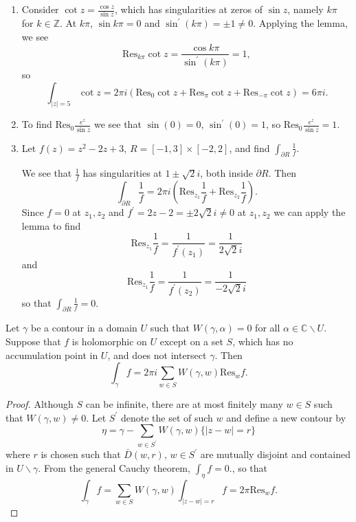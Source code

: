 \begin{xmpl}
  \begin{enumerate}
    \item{
      Consider $\cot z = \frac{\cos z}{\sin z}$, which has
      singularities at zeros of $\sin z$, namely $k \pi$ for
      $k \in \mathbb{Z}$.
      At $k\pi$, $\sin k\pi = 0$ and $\sin^\prime(k \pi) = \pm 1 \neq
      0$. Applying the lemma, we see
      $$
        \mathrm{Res}_{k \pi} \cot z
      = \frac{\cos k \pi}{\sin^\prime(k \pi)}
      = 1,
      $$
      so
      $$
        \int_{|z| = 5}
          \cot z
      = 2 \pi i
          ( \mathrm{Res}_0 \cot z
          + \mathrm{Res}_\pi \cot z
          + \mathrm{Res}_{-\pi} \cot z
          )
      = 6 \pi i.
      $$
    }
    \item{
      To find $\mathrm{Res}_0 \frac{e^z}{\sin z}$ we see that
      $\sin(0) = 0$, $\sin^\prime(0) = 1$, so
      $\mathrm{Res}_0 \frac{e^z}{\sin z} = 1$.
    }
    \item{
      Let $f(z) = z^2 - 2z + 3$,
      $R = [-1, 3] \times [-2, 2]$, and find
      $\int_{\partial R} \frac{1}{f}$.

      We see that $\frac{1}{f}$ has singularities at
      $1 \pm \sqrt{2} i$, both inside $\partial R$.
      Then
      $$
        \int_{\partial R} \frac{1}{f}
      = 2 \pi i
        (
          \mathrm{Res}_{z_1} \frac{1}{f}
        + \mathrm{Res}_{z_2} \frac{1}{f}
        ).
      $$
      Since $f = 0$ at $z_1, z_2$ and
      $f^\prime = 2z - 2 = \pm 2 \sqrt{2} i \neq 0$
      at $z_1, z_2$ we can apply the lemma to find
      $$
        \mathrm{Res}_{z_1}
          \frac{1}{f}
      = \frac{1}{f^\prime(z_1)} = \frac{1}{2 \sqrt{2} i}
      $$
      and
      $$
        \mathrm{Res}_{z_1}
          \frac{1}{f}
      = \frac{1}{f^\prime(z_2)} = \frac{1}{-2 \sqrt{2} i}
      $$
      so that $\int_{\partial R} \frac{1}{f} = 0$.
    }
  \end{enumerate}
\end{xmpl}

\begin{theorem}
Let $\gamma$ be a contour in a domain $U$ such that
$W(\gamma, \alpha) = 0$ for all
$\alpha \in \mathbb{C} \backslash U$. Suppose that $f$ is
holomorphic on $U$ except on a set $S$, which has no
accumulation point in $U$, and does not intersect $\gamma$.
Then
$$
  \int_\gamma f
= 2 \pi i
  \sum_{w \in S}
    W(\gamma, w)
    \mathrm{Res}_w f.
$$
\end{theorem}

\begin{proof}
  Although $S$ can be infinite, there are at most finitely many
  $w \in S$ such that $W(\gamma, w) \neq 0$. Let $S^\prime$
  denote the set of such $w$ and define a new contour by
  $$
    \eta
  = \gamma
  - \sum_{w \in S^\prime}
      W(\gamma, w)
      \{ |z - w| = r \}
  $$
  where $r$ is chosen such that $\bar{D}(w, r)$,
  $w \in S^\prime$ are mutually disjoint and contained in
  $U \backslash \gamma$. From the general Cauchy theorem,
  $\int_\eta f = 0$., so that
  $$
    \int_\gamma f
  = \sum_{w \in S}
      W(\gamma, w)
      \int_{|z - w| = r} f
  = 2 \pi \mathrm{Res}_w f.
  $$
\end{proof}
